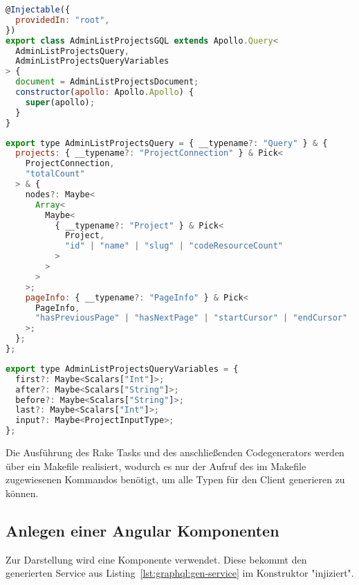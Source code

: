\begin{lstlisting}[language=JavaScript,float=h!,caption={Generierter Service enthält den Aufruf der Query als Instanzvariable}, label={lst:graphql:gen-service}]
@Injectable({
  providedIn: "root",
})
export class AdminListProjectsGQL extends Apollo.Query<
  AdminListProjectsQuery,
  AdminListProjectsQueryVariables
> {
  document = AdminListProjectsDocument;
  constructor(apollo: Apollo.Apollo) {
    super(apollo);
  }
}
\end{lstlisting}

\begin{lstlisting}[language=JavaScript,float=h!,caption={Generierter Antworttyp}, label={lst:graphql:gen-responsetype}]
export type AdminListProjectsQuery = { __typename?: "Query" } & {
  projects: { __typename?: "ProjectConnection" } & Pick<
    ProjectConnection,
    "totalCount"
  > & {
    nodes?: Maybe<
      Array<
        Maybe<
          { __typename?: "Project" } & Pick<
            Project,
            "id" | "name" | "slug" | "codeResourceCount"
          >
        >
      >
    >;
    pageInfo: { __typename?: "PageInfo" } & Pick<
      PageInfo,
      "hasPreviousPage" | "hasNextPage" | "startCursor" | "endCursor"
    >;
  };
};
\end{lstlisting}
\begin{lstlisting}[language=JavaScript,float=h!,caption={Generierter Parametertyp}, label={lst:graphql:gen-variables}]
export type AdminListProjectsQueryVariables = {
  first?: Maybe<Scalars["Int"]>;
  after?: Maybe<Scalars["String"]>;
  before?: Maybe<Scalars["String"]>;
  last?: Maybe<Scalars["Int"]>;
  input?: Maybe<ProjectInputType>;
};
\end{lstlisting}


Die Ausführung des Rake Tasks und des anschließenden Codegenerators werden über ein Makefile realisiert, wodurch es nur der Aufruf des im Makefile zugewiesenen Kommandos benötigt, um alle Typen für den Client generieren zu können. 

\subsection{Anlegen einer Angular Komponenten}
\label{impl:graphql:component}

Zur Darstellung wird eine Komponente verwendet. Diese bekommt den generierten Service aus Listing~\ref{lst:graphql:gen-service} im Konstruktor "injiziert". 

